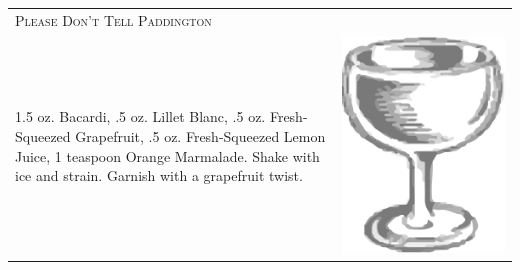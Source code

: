 \documentclass{article}
\begin{document}
\begin{tabular}{p{2in} p{0.5in}}
\multicolumn{2}{p{3in}}{\centering\Huge\textsc{Please Don't Tell Paddington}} \\ 
  \vspace{-0.1in}1.5 oz. Bacardi, .5 oz. Lillet Blanc, .5 oz. Fresh-Squeezed Grapefruit, .5 oz. Fresh-Squeezed Lemon Juice, 1 teaspoon Orange Marmalade. Shake with ice and strain. Garnish with a grapefruit twist. &
  \vspace{-0.1in} \includegraphics{coupe.png}
\end{tabular}
\end{document}
